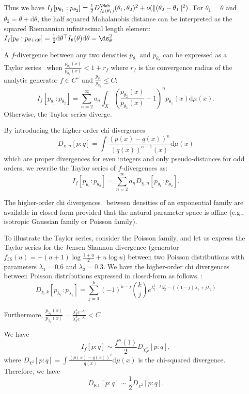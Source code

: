 \documentclass[11pt]{article}
\def\dmu{\mathrm{d}\mu}
\def\KL{\mathrm{KL}}
\def\dmu{\mathrm{d}\mu}
\def\KL{\mathrm{KL}}
\def\JS{\mathrm{JS}}
\def\dtheta{\mathrm{d}\theta}
\begin{document}
Thus we have $I_f[p_{\theta_1}:p_{\theta_2}]=\frac{1}{2}D^\Mah_{I_\theta(\theta_1)}(\theta_1,\theta_2)^2+o(\|(\theta_2-\theta_1\|^2)$.
For $\theta_1=\theta$ and $\theta_2=\theta+\dtheta$, the half squared Mahalanobis distance can be interpreted as the squared Riemannian infinitesimal length element: $I_f[p_{\theta}:p_{\theta+\dtheta}]=\frac{1}{2}\dtheta^\top I_\theta(\theta) \dtheta=\ds_\theta^2$.

A $f$-divergence between any two densities $p_{\theta_1}$ and $p_{\theta_2}$ can be expressed as a Taylor series~\cite{fdivCauchy-2021} when $\frac{p_{\theta_2}(x)}{p_{\theta_1}(x)} < 1+r_f$ 
where $r_f$ is the convergence radius of the analytic generator $f\in C^\omega$ and $\frac{p_{\theta_1}}{p_{\theta_2}}\leq C$:
$$
I_f[p_{\theta_1} : p_{\theta_2}] = \sum_{n=2}^{\infty} a_n \int_{X}  \left( \frac{p_{\theta_2}(x)}{p_{\theta_1}(x)} - 1 \right)^n p_{\theta_1}(x) \dmu(x).
$$
Otherwise, the Taylor series diverge.

By introducing the higher-order chi divergences~\cite{fdivchiorder-2013} 
$$
D_{\chi,n}[p:q]=\int \frac{\left(p(x)-q(x)\right)^n}{(q(x))^{n-1}(x)} \dmu(x)
$$
which are proper divergences for even integers and only pseudo-distances for odd orders, we rewrite the Taylor series of $f$-divergences as:
$$
I_f[p_{\theta_1} : p_{\theta_2}] = \sum_{n=2}^{\infty} a_n D_{\chi,n}[p_{\theta_1} : p_{\theta_2}].
$$

The higher-order chi divergences~\cite{fdivchiorder-2013} between densities of an exponential family are available in closed-form provided that the natural parameter space is affine (e.g., isotropic Gaussian family or Poisson family).

To illustrate the Taylor series, consider the Poisson family, and let us express the Taylor series for the Jensen-Shannon divergence
(generator $f_\JS(u)=-(u+1)\log \frac{1+u}{2} + u\log u$) between two Poisson distributions with parameters $\lambda_1=0.6$ and $\lambda_2=0.3$.
We have the higher-order chi divergences between Poisson distributions expressed in closed-form as follows~\cite{fdivchiorder-2013}:
$$
D_{\chi,k}[p_{\lambda_1}:p_{\lambda_2}]=\sum_{j=0}^k (-1)^{k-j} {k \choose j} e^{\lambda_1^{1-j} \lambda_2^{j} - ((1-j)\lambda_1 +  j\lambda_2)}
$$

Furthermore, $\frac{p_{\lambda_1}(x)}{p_{\lambda_2}(x)}=\frac{\lambda_1^k e^{-\lambda_1}}{\lambda_2^k e^{-\lambda_2}}<C$


We have
$$
I_f[p:q]\sim \frac{f''(1)}{2}D_{\chi^2_N}[p:q],
$$ 
where $D_{\chi^2}[p:q]=\int \frac{(p(x)-q(x))^2}{q(x)} \dmu(x)$ is the chi-squared divergence.
Therefore, we have
\begin{equation}
D_\KL[p:q]\sim \frac{1}{2}D_{\chi^2}[p:q].
\end{equation}
\end{document}
